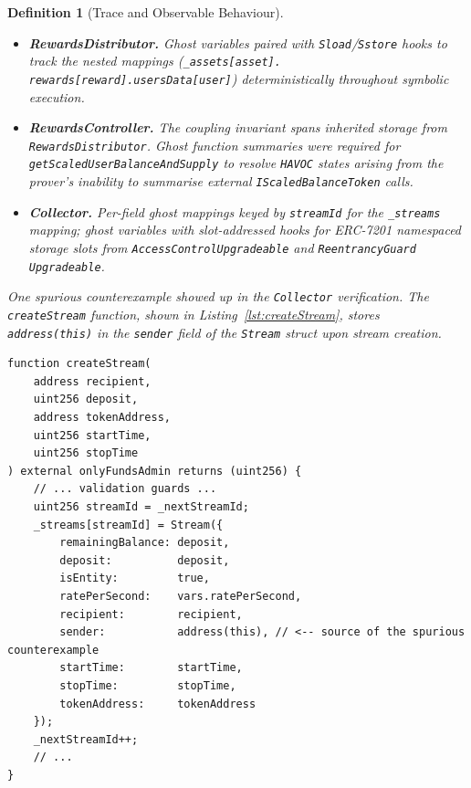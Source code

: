 \documentclass[manuscript,screen,review]{acmart}
\newtheorem{definition}{Definition}
\begin{document}
\begin{definition}[Trace and Observable Behaviour]
\begin{itemize}
  \item \textbf{RewardsDistributor.} Ghost variables paired with
    \texttt{Sload}/\texttt{Sstore} hooks to track the nested mappings
    (\texttt{\_assets[asset].\\rewards[reward].usersData[user]})
    deterministically throughout symbolic execution.

  \item \textbf{RewardsController.} The coupling invariant spans inherited
    storage from \texttt{RewardsDistributor}. Ghost function summaries were
    required for \texttt{getScaledUserBalanceAndSupply} to resolve
    \texttt{HAVOC} states arising from the prover's inability to summarise
    external \texttt{IScaledBalanceToken} calls.

  \item \textbf{Collector.} Per-field ghost mappings keyed by
    \texttt{streamId} for the \texttt{\_streams} mapping; ghost variables
    with slot-addressed hooks for ERC-7201 namespaced storage slots from
    \texttt{AccessControlUpgradeable} and
    \texttt{ReentrancyGuard\\Upgradeable}.
\end{itemize}

One spurious counterexample showed up in the \texttt{Collector} verification. The \texttt{createStream} function, shown in Listing~\ref{lst:createStream}, stores \texttt{address(this)} in the \texttt{sender} field of the \texttt{Stream} struct upon stream creation.

\begin{listing}[htb]
\centering
\begin{scriptsize}
\begin{verbatim}
function createStream(
    address recipient,
    uint256 deposit,
    address tokenAddress,
    uint256 startTime,
    uint256 stopTime
) external onlyFundsAdmin returns (uint256) {
    // ... validation guards ...
    uint256 streamId = _nextStreamId;
    _streams[streamId] = Stream({
        remainingBalance: deposit,
        deposit:          deposit,
        isEntity:         true,
        ratePerSecond:    vars.ratePerSecond,
        recipient:        recipient,
        sender:           address(this), // <-- source of the spurious counterexample
        startTime:        startTime,
        stopTime:         stopTime,
        tokenAddress:     tokenAddress
    });
    _nextStreamId++;
    // ...
}
\end{verbatim}
\end{scriptsize}
\caption{The \texttt{createStream} function in the \texttt{Collector}
  contract. The field \texttt{sender: address(this)} writes the contract's
  own address into persistent storage, and is the source of the spurious
  counterexample described in the text.}
\label{lst:createStream}
\end{listing}


\end{definition}
\end{document}
